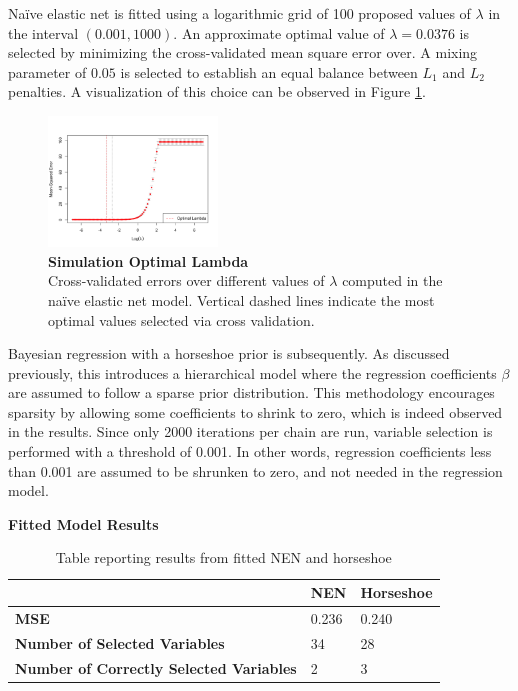 \documentclass[
	a4paper, %
	10pt, %
	unnumberedsections, %
	twoside, %
]{LTJournalArticle}
\newcommand{\1}{\mathbbm{1}}
\begin{document}
Naïve elastic net is fitted using a logarithmic grid of 100 proposed values of $\lambda$ in the interval $(0.001, 1000)$. An approximate optimal value of $\lambda=0.0376$ is selected by minimizing the cross-validated mean square error over. A mixing parameter of $0.05$ is selected to establish an equal balance between $L_1$ and $L_2$ penalties. A visualization of this choice can be observed in Figure \ref{fig:EN-lambda}.

\begin{figure}[ht] %
\centering
\captionsetup{justification=centering, margin=-0.2cm}
\includegraphics[width=0.4\textwidth]{Figures/simulate_lambda.png} 
\caption{\textbf{Simulation Optimal Lambda} \\
Cross-validated errors over different values of $\lambda$ computed in the naïve elastic net model. Vertical dashed lines indicate the most optimal values selected via cross validation.}
\label{fig:EN-lambda}
\end{figure} 

Bayesian regression with a horseshoe prior is subsequently. As discussed previously, this introduces a hierarchical model where the regression coefficients $\beta$ are assumed to follow a sparse prior distribution. This methodology encourages sparsity by allowing some coefficients to shrink to zero, which is indeed observed in the results. Since only 2000 iterations per chain are run, variable selection is performed with a threshold of 0.001. In other words, regression coefficients less than 0.001 are assumed to be shrunken to zero, and not needed in the regression model. 


\begin{table}[!htbp]
\centering
\caption{\textbf{Fitted Model Results}}
\label{tab:results}
\begin{threeparttable}
\begin{tabular}{p{3.5cm}p{1cm}p{1.5cm}}
\toprule
 & {\bf NEN} & {\bf Horseshoe} \\ 
  \hline
 {\bf MSE} & 0.236  & 0.240 \\
 {\bf Number of Selected Variables} & 34 & 28 \\
 {\bf Number of Correctly Selected Variables} & 2 & 3  \\
   \hline
\bottomrule
\end{tabular}
\end{threeparttable}
\caption*{Table reporting results from fitted NEN and horseshoe}
\end{table}
\end{document}
